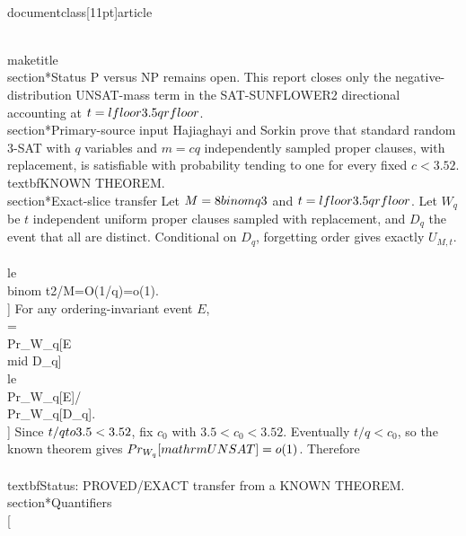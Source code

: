 \\documentclass[11pt]{article}
\begin{document}
\\maketitle
\\section*{Status}
P versus NP remains open. This report closes only the negative-distribution UNSAT-mass term in the SAT-SUNFLOWER2 directional accounting at $t=\\lfloor3.5q\\rfloor$.
\\section*{Primary-source input}
Hajiaghayi and Sorkin prove that standard random 3-SAT with $q$ variables and $m=cq$ independently sampled proper clauses, with replacement, is satisfiable with probability tending to one for every fixed $c<3.52$. \\textbf{KNOWN THEOREM}.
\\section*{Exact-slice transfer}
Let $M=8\\binom q3$ and $t=\\lfloor3.5q\\rfloor$. Let $W_q$ be $t$ independent uniform proper clauses sampled with replacement, and $D_q$ the event that all are distinct. Conditional on $D_q$, forgetting order gives exactly $U_{M,t}$.
\\[
\\Pr_{W_q}[D_q^c]\\le \\binom t2/M=O(1/q)=o(1).
\\]
For any ordering-invariant event $E$,
\\[
\\Pr_{U_{M,t}}[E]=\\Pr_{W_q}[E\\mid D_q]
\\le \\Pr_{W_q}[E]/\\Pr_{W_q}[D_q].
\\]
Since $t/q\\to3.5<3.52$, fix $c_0$ with $3.5<c_0<3.52$. Eventually $t/q<c_0$, so the known theorem gives $\\Pr_{W_q}[\\mathrm{UNSAT}]=o(1)$. Therefore
\\[
\\boxed{\\delta_-(q):=\\Pr_{U_{M,t}}[\\mathrm{UNSAT}]=o(1).}
\\]
\\textbf{Status: PROVED/EXACT transfer from a KNOWN THEOREM.}
\\section*{Quantifiers}
\\[
\end{document}
